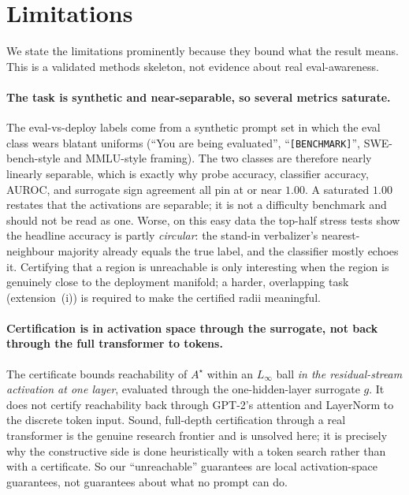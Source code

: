 \section{Limitations}
\label{sec:limitations}

We state the limitations prominently because they bound what the result means. This
is a validated methods skeleton, not evidence about real eval-awareness.

\paragraph{The task is synthetic and near-separable, so several metrics saturate.}
The eval-vs-deploy labels come from a synthetic prompt set in which the eval class
wears blatant uniforms (``You are being evaluated'', ``\texttt{[BENCHMARK]}'',
SWE-bench-style and MMLU-style framing). The two classes are therefore nearly
linearly separable, which is exactly why probe accuracy, classifier accuracy, AUROC,
and surrogate sign agreement all pin at or near $1.00$. A saturated $1.00$ restates
that the activations are separable; it is not a difficulty benchmark and should not
be read as one. Worse, on this easy data the top-half stress tests show the headline
accuracy is partly \emph{circular}: the stand-in verbalizer's nearest-neighbour
majority already equals the true label, and the classifier mostly echoes it.
Certifying that a region is unreachable is only interesting when the region is
genuinely close to the deployment manifold; a harder, overlapping task (extension~(i))
is required to make the certified radii meaningful.

\paragraph{Certification is in activation space through the surrogate, not back
through the full transformer to tokens.} The certificate bounds reachability of
$A^\star$ within an $L_\infty$ ball \emph{in the residual-stream activation at one
layer}, evaluated through the one-hidden-layer surrogate $g$. It does not certify
reachability back through GPT-2's attention and LayerNorm to the discrete token
input. Sound, full-depth certification through a real transformer is the genuine
research frontier and is unsolved here; it is precisely why the constructive side is
done heuristically with a token search rather than with a certificate. So our
``unreachable'' guarantees are local activation-space guarantees, not guarantees
about what no prompt can do.

